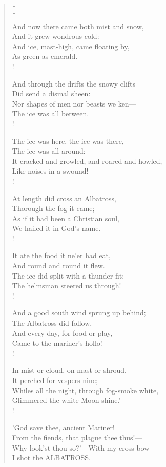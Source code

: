 \documentclass[11pt]{article}
\begin{document}
\begin{verse}[\linewidth]
\bigskip

And now there came both mist and snow, \\
And it grew wondrous cold: \\
And ice, mast-high, came floating by, \\
As green as emerald. \\!

And through the drifts the snowy clifts \\
Did send a dismal sheen: \\
Nor shapes of men nor beasts we ken— \\
The ice was all between. \\!

\clearpage

The ice was here, the ice was there, \\
The ice was all around: \\
It cracked and growled, and roared and howled, \\
Like noises in a swound! \\!

At length did cross an Albatross, \\
Thorough the fog it came; \\
As if it had been a Christian soul, \\
We hailed it in God's name. \\!

\bigskip

It ate the food it ne'er had eat, \\
And round and round it flew. \\
The ice did split with a thunder-fit; \\
The helmsman steered us through! \\!

And a good south wind sprung up behind; \\
The Albatross did follow, \\
And every day, for food or play, \\
Came to the mariner's hollo! \\!

In mist or cloud, on mast or shroud, \\
It perched for vespers nine; \\
Whiles all the night, through fog-smoke white, \\
Glimmered the white Moon-shine.' \\!

\bigskip

'God save thee, ancient Mariner! \\
From the fiends, that plague thee thus!— \\
Why look'st thou so?'—With my cross-bow \\
I shot the ALBATROSS.

\end{verse}
\end{document}

